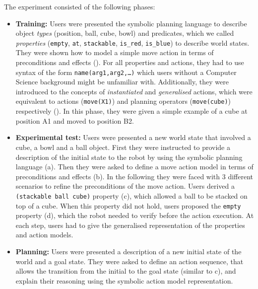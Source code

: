 The experiment consisted of the following phases:
\begin{itemize}
  \item{\textbf{Training:} Users were presented the symbolic planning language to describe object \textit{types} (\ie position, ball, cube, bowl) and predicates, which we called \textit{properties} (\ie \texttt{empty}, \texttt{at}, \texttt{stackable}, \texttt{is\_red}, \texttt{is\_blue}) to describe world states.
They were shown how to model a simple move action in terms of preconditions and effects ().
For all properties and actions, they had to use syntax of the form \texttt{name(arg1,arg2,\dots)} which users without a  Computer Science background might be unfamiliar with.
Additionally, they were introduced to the concepts of \textit{instantiated} and \textit{generalised} actions, which were equivalent to actions (\eg \texttt{move(X1)}) and planning operators (\eg \texttt{move(cube)}) respectively ().
In this phase, they were given a simple example of a cube at position A1 and moved to position B2.}
  \item{\textbf{Experimental test:} Users were presented a new world state that involved a cube, a bowl and a ball object. 
  	First they were instructed to provide a description of the initial state to the robot by using the symbolic planning language (a).
Then they were asked to define a move action model in terms of preconditions and effects (b).
In the following they were faced with 3 different scenarios to refine the preconditions of the move action.
Users derived a \texttt{(stackable ball cube)} property (c), which allowed a ball to be stacked on top of a cube.
When this property did not hold, users proposed the \texttt{empty} property (d), which the robot needed to verify before the action execution.
At each step, users had to give the generalised representation of the properties and action models.}
  \item{\textbf{Planning:} Users were presented a description of a new initial state of the world and a goal state.
They were asked to define an action sequence, that allows the transition from the initial to the goal state (similar to c), and explain their reasoning using the symbolic action model representation.
}
\end{itemize}
